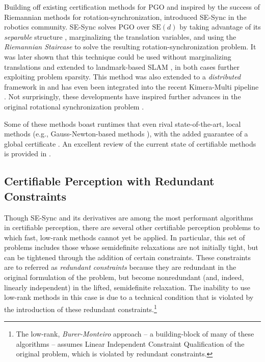\documentclass[lettersize,journal]{IEEEtran}
\begin{document}
Building off existing certification methods for PGO \cite{carloneLagrangianDuality3D2015} and inspired by the success of Riemannian methods for rotation-synchronization, \cite{rosenSESyncCertifiablyCorrect2019} introduced SE-Sync in the robotics community. SE-Sync solves PGO over $\mbox{SE}(d)$ by taking advantage of its \emph{separable} structure \cite{khosoussiSparseSeparableSLAM2016}, marginalizing the translation variables, and using the \emph{Riemannian Staircase} to solve the resulting rotation-synchronization problem. It was later shown that this technique could be used without marginalizing translations \cite{brialesCartanSyncFastGlobal2017} and extended to landmark-based SLAM \cite{holmesEfficientGlobalOptimality2023}, in both cases further exploiting problem sparsity. This method was also extended to a \emph{distributed} framework in \cite{tianDistributedCertifiablyCorrect2021} and has even been integrated into the recent Kimera-Multi pipeline \cite{tianKimeraMultiRobustDistributed2022}. Not surprisingly, these developments have inspired further advances in the original rotational synchronization problem \cite{dellaertShonanRotationAveraging2020}. 

Some of these methods boast runtimes that even rival state-of-the-art, local methods (e.g., Gauss-Newton-based methods \cite{gtsam}), with the added guarantee of a global certificate \cite{juricComparisonGraphOptimization2021, brialesCartanSyncFastGlobal2017}. An excellent review of the current state of certifiable methods is provided in \cite{rosenAdvancesInferenceRepresentation2021}.

\subsection{Certifiable Perception with Redundant Constraints}\label{sec:RedundantConstraints}

Though SE-Sync and its derivatives are among the most performant algorithms in certifiable perception, there are several other certifiable perception problems to which fast, low-rank methods cannot yet be applied. In particular, this set of problems includes those whose semidefinite relaxations are not initially tight, but can be tightened through the addition of certain constraints. These constraints are to referred as \emph{redundant constraints} because they are redundant in the original formulation of the problem, but become nonredundant (and, indeed, linearly independent) in the lifted, semidefinite relaxation. The inability to use low-rank methods in this case is due to a technical condition that is violated by the introduction of these redundant constraints.\footnote{The low-rank, \emph{Burer-Monteiro} approach -- a building-block of many of these algorithms -- assumes Linear Independent Constraint Qualification of the original problem, which is violated by redundant constraints.}
\end{document}
